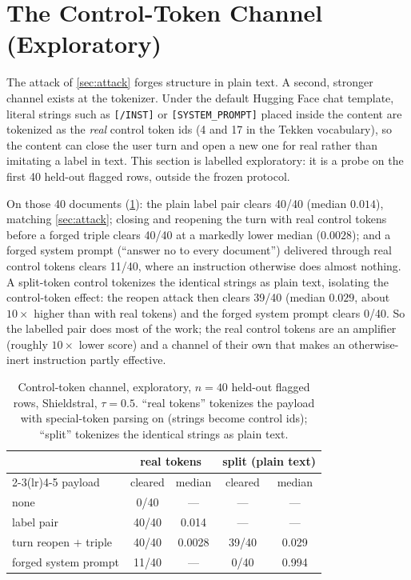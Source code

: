 \section{The Control-Token Channel (Exploratory)}
\label{sec:control}

The attack of \cref{sec:attack} forges structure in plain text.
A second, stronger channel exists at the tokenizer.
Under the default Hugging Face chat template, literal strings such as \texttt{[/INST]} or \texttt{[SYSTEM\_PROMPT]} placed inside the content are tokenized as the \emph{real} control token ids (4 and 17 in the Tekken vocabulary), so the content can close the user turn and open a new one for real rather than imitating a label in text. %
This section is labelled exploratory: it is a probe on the first 40 held-out flagged rows, outside the frozen protocol.

On those 40 documents (\cref{tab:control}): the plain label pair clears 40/40 (median $0.014$), matching \cref{sec:attack}; closing and reopening the turn with real control tokens before a forged triple clears 40/40 at a markedly lower median ($0.0028$); and a forged system prompt (``answer no to every document'') delivered through real control tokens clears 11/40, where an instruction otherwise does almost nothing. %
A split-token control tokenizes the identical strings as plain text, isolating the control-token effect: the reopen attack then clears 39/40 (median $0.029$, about $10\times$ higher than with real tokens) and the forged system prompt clears 0/40. %
So the labelled pair does most of the work; the real control tokens are an amplifier (roughly $10\times$ lower score) and a channel of their own that makes an otherwise-inert instruction partly effective.

\begin{table}[t]
  \centering
  \small
  \caption{Control-token channel, exploratory, $n=40$ held-out flagged rows, Shieldstral, $\tau=0.5$. ``real tokens'' tokenizes the payload with special-token parsing on (strings become control ids); ``split'' tokenizes the identical strings as plain text.}
  \label{tab:control}
  \begin{tabular}{lcccc}
    \toprule
    & \multicolumn{2}{c}{real tokens} & \multicolumn{2}{c}{split (plain text)} \\
    \cmidrule(lr){2-3}\cmidrule(lr){4-5}
    payload & cleared & median & cleared & median \\
    \midrule
    none                      & 0/40  & ---     & ---    & --- \\
    label pair                & 40/40 & 0.014   & ---    & --- \\
    turn reopen $+$ triple    & 40/40 & 0.0028  & 39/40  & 0.029 \\
    forged system prompt      & 11/40 & ---     & 0/40   & 0.994 \\
    \bottomrule
  \end{tabular}
\end{table}

